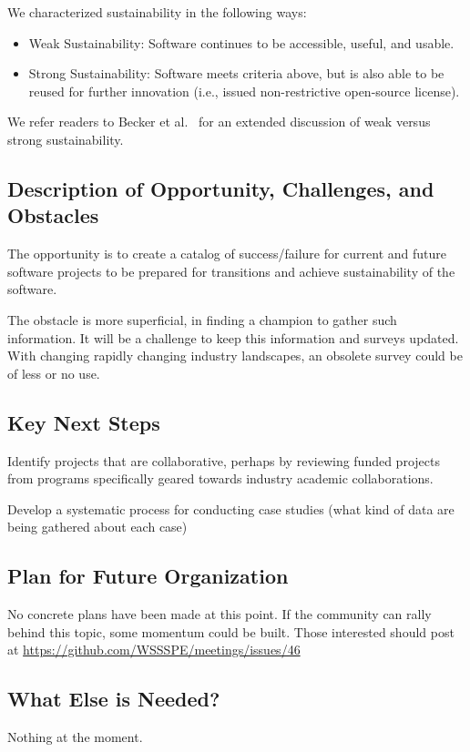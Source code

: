 We characterized sustainability in the following ways:
\begin{itemize}

\item Weak Sustainability: Software continues to be accessible, useful, and
usable.

\item Strong Sustainability: Software meets criteria above, but is also able to
be reused for further innovation (i.e., issued non-restrictive open-source
license).

\end{itemize}
We refer readers to Becker et al.~\cite{Becker:2014} for an extended discussion of weak versus strong
sustainability. 

\subsection{Description of Opportunity, Challenges, and Obstacles}
The opportunity is to create a catalog of success/failure for current and future software projects to be prepared for transitions and achieve sustainability of the software. 

The obstacle is more superficial, in finding a champion to gather such information. It will be a challenge to keep this information and surveys updated. With changing rapidly changing industry landscapes, an obsolete survey could be of less or no use. 

\subsection{Key Next Steps}

Identify projects that are collaborative, perhaps by reviewing funded projects from programs specifically geared towards industry academic collaborations.

Develop a systematic process for conducting case studies (what kind of data are being gathered about each case)

\subsection{Plan for Future Organization}
No concrete plans have been made at this point. If the community can rally behind this topic, some momentum could be built. Those interested should post at \url{https://github.com/WSSSPE/meetings/issues/46} 

\subsection{What Else is Needed?}
Nothing at the moment. 

